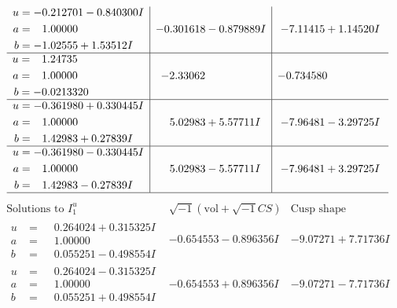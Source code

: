 \documentclass[1p]{elsarticle_modified}
\theoremstyle{definition}
\newcommand{\I}{\sqrt{-1}}
\begin{document}
$$\begin{array}{c|c|c}
\begin{aligned}
u &= -0.212701 - 0.840300 I \\
a &= \phantom{-}1.00000\phantom{ +0.000000I} \\
b &= -1.02555 + 1.53512 I\end{aligned}
 & -0.301618 - 0.879889 I & -7.11415 + 1.14520 I \\ \hline\begin{aligned}
u &= \phantom{-}1.24735\phantom{ +0.000000I} \\
a &= \phantom{-}1.00000\phantom{ +0.000000I} \\
b &= -0.0213320\phantom{ +0.000000I}\end{aligned}
 & -2.33062\phantom{ +0.000000I} & -0.734580\phantom{ +0.000000I} \\ \hline\begin{aligned}
u &= -0.361980 + 0.330445 I \\
a &= \phantom{-}1.00000\phantom{ +0.000000I} \\
b &= \phantom{-}1.42983 + 0.27839 I\end{aligned}
 & \phantom{-}5.02983 + 5.57711 I & -7.96481 - 3.29725 I \\ \hline\begin{aligned}
u &= -0.361980 - 0.330445 I \\
a &= \phantom{-}1.00000\phantom{ +0.000000I} \\
b &= \phantom{-}1.42983 - 0.27839 I\end{aligned}
 & \phantom{-}5.02983 - 5.57711 I & -7.96481 + 3.29725 I\\
 \hline 
 \end{array}$$\newpage$$\begin{array}{c|c|c}  
\text{Solutions to }I^u_{1}& \I (\text{vol} + \sqrt{-1}CS) & \text{Cusp shape}\\
 \hline 
\begin{aligned}
u &= \phantom{-}0.264024 + 0.315325 I \\
a &= \phantom{-}1.00000\phantom{ +0.000000I} \\
b &= \phantom{-}0.055251 - 0.498554 I\end{aligned}
 & -0.654553 - 0.896356 I & -9.07271 + 7.71736 I \\ \hline\begin{aligned}
u &= \phantom{-}0.264024 - 0.315325 I \\
a &= \phantom{-}1.00000\phantom{ +0.000000I} \\
b &= \phantom{-}0.055251 + 0.498554 I\end{aligned}
 & -0.654553 + 0.896356 I & -9.07271 - 7.71736 I \\ \hline\begin{aligned}

\end{aligned}
\end{array}$$
\end{document}
